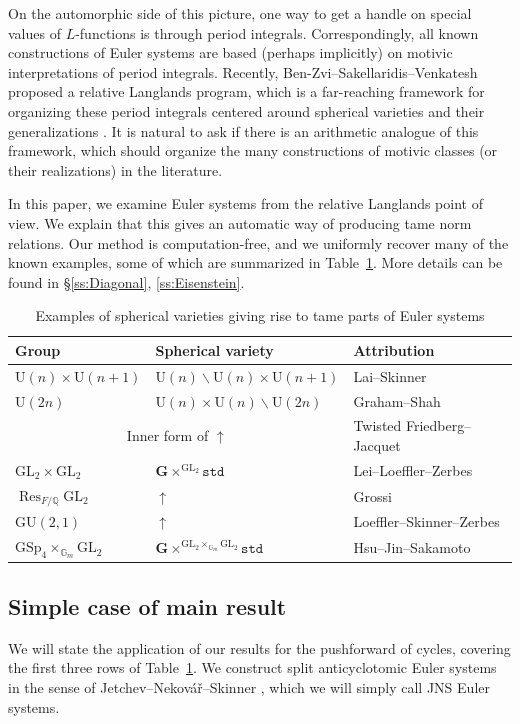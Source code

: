 \documentclass{amsart}
\theoremstyle{definition}
\theoremstyle{remark}
\newcommand{\1}{\mathbf{1}}
\newcommand{\G}{\mathbf{G}}
\newcommand{\GL}{\mathrm{GL}}
\newcommand{\Q}{\mathbb{Q}}
\newcommand{\U}{\mathrm{U}}
\DeclareMathOperator{\Res}{Res}
\theoremstyle{definition}
\renewcommand{\G}{\mathbb{G}}
\newcommand{\bG}{\mathbf{G}}
\begin{document}
On the automorphic side of this picture, one way to get a handle on special values of $L$-functions is through period integrals. Correspondingly, all known constructions of Euler systems are based (perhaps implicitly) on motivic interpretations of period integrals. Recently, Ben-Zvi--Sakellaridis--Venkatesh proposed a relative Langlands program, which is a far-reaching framework for organizing these period integrals centered around spherical varieties and their generalizations \cite{BZSV}. It is natural to ask if there is an arithmetic analogue of this framework, which should organize the many constructions of motivic classes (or their realizations) in the literature.

In this paper, we examine Euler systems from the relative Langlands point of view. We explain that this gives an automatic way of producing tame norm relations. Our method is computation-free, and we uniformly recover many of the known examples, some of which are summarized in Table~\ref{tab:Examples}. More details can be found in \S\ref{ss:Diagonal}, \ref{ss:Eisenstein}.

\begin{table}[ht]
    \centering
    \begin{tabular}{l|l|l}
    Group & Spherical variety & Attribution\\ \hline
    $\U(n)\times\U(n+1)$ & $\U(n)\backslash\U(n)\times\U(n+1)$ & Lai--Skinner \cite{LaiSkinner}\\ \hline
    $\U(2n)$ & $\U(n)\times\U(n)\backslash\U(2n)$ &  Graham--Shah \cite{GrahamShah}\\ \hline
    \multicolumn{2}{c|}{Inner form of $\uparrow$} & Twisted Friedberg--Jacquet\\ \hline
    \hline
    $\GL_2\times\GL_2$ & $\bG\times^{\GL_2}\mathtt{std}$ &  Lei--Loeffler--Zerbes \cite{LLZ}\\ \hline
    $\Res_{F/\Q}\GL_2$ & $\uparrow$ &  Grossi \cite{GrossiAF}\\ \hline
    $\mathrm{GU}(2,1)$ & $\uparrow$ & Loeffler--Skinner--Zerbes \cite{LSZ-U3}\\ \hline
    $\mathrm{GSp}_4\times_{\G_m}\GL_2$ & $\bG\times^{\GL_2\times_{\G_m}\GL_2}\mathtt{std}$ & Hsu--Jin--Sakamoto \cite{HJS}
    \end{tabular}
    \caption{Examples of spherical varieties giving rise to tame parts of Euler systems}
    \label{tab:Examples}
\end{table}

\subsection{Simple case of main result}
We will state the application of our results for the pushforward of cycles, covering the first three rows of Table~\ref{tab:Examples}. We construct split anticyclotomic Euler systems in the sense of Jetchev--Nekov\'a\v{r}--Skinner \cite{JNS}, which we will simply call JNS Euler systems.
\end{document}
